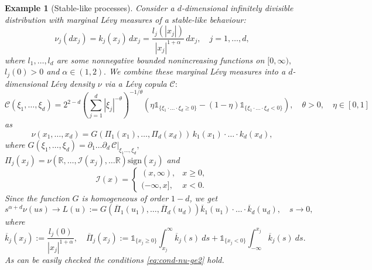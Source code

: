 \documentclass[preprint, 3p, authoryear]{elsarticle}
\newcommand{\In}{\mathds{1}}
\newtheorem{example}{Example}
\theoremstyle{definition}
\begin{document}
\begin{example}[Stable-like processes]
Consider a \(d\)-dimensional infinitely divisible distribution with  marginal L\'evy measures of a stable-like behaviour:
\[
\nu_{j}(dx_{j})=k_{j}(x_{j})\, dx_{j}=\frac{l_{j}(|x_{j}|)}{|x_{j}|^{1+\alpha}}\, dx_{j},\quad j=1,\ldots,d,
\]
where $l_{1},\ldots,l_{d}$ are some nonnegative bounded nonincreasing functions on $[0,\infty),$  $l_{j}(0)>0$ and $\alpha\in (1,2).$  We combine these marginal L\'evy measures into a \(d\)-dimensional L\'evy density \(\nu\) via a L\'evy copula $\mathcal{C}:$
\[
\mathcal{C}(\xi_{1},\ldots,\xi_{d})=2^{2-d}\left(\sum_{j=1}^{d}\left|\xi_{j}\right|^{-\theta}\right)^{-1/\theta}\left(\eta \In_{\{\xi_{1}\cdot\ldots\cdot\xi_{d}\geq0\}}-(1-\eta)\In_{\{\xi_{1}\cdot\ldots\cdot\xi_{d}<0\}}\right), \quad \theta>0, \quad \eta\in[0,1]
\]
 as 
\[
\nu(x_{1},\ldots,x_{d})=G(\Pi_{1}(x_{1}),\ldots,\Pi_{d}(x_{d}))\, k_{1}(x_{1})\cdot\ldots\cdot k_{d}(x_{d}),
\]
where $G(\xi_{1},\ldots,\xi_{d})=\left.\partial_{1}\ldots\partial_{d}\mathcal{\, C}\right|_{\xi_{1}\ldots,\xi_{d}},$ \(\Pi_{j}(x_{j})=\nu\left(\mathbb{R},\ldots,\mathcal{I}(x_{j}),\ldots\mathbb{R}\right)\mathrm{sign}(x_{j})\)
and
\[
\mathcal{I}(x)=\begin{cases}
(x,\infty), & x\geq0,\\
(-\infty,x], & x<0.
\end{cases}
\]
Since the function $G$ is homogeneous of order $1-d$, we get 
\[
s^{\alpha+d}\nu(us)\to  L(u):=G\left(\overline{\Pi}_{1}(u_{1}),\ldots,\overline{\Pi}_{d}(u_{d})\right)
\overline{k}_{1}(u_{1})\cdot\ldots\cdot\overline{k}_{d}(u_{d}), \quad s \to 0,
\]
where
\[
\overline{k}_{j}(x_{j}):=\frac{l_{j}(0)}{|x_{j}|^{1+\alpha}},\quad\overline{\Pi}_{j}(x_{j}):=\In_{\{x_{j}\geq0\}}\int_{x_{j}}^{\infty}\overline{k}_{j}(s)\: ds+\In_{\{x_{j}<0\}}\int_{-\infty}^{x_{j}}\overline{k}_{j}(s)\: ds.
\]
As can be easily checked the conditions \eqref{eq:cond-nu-ge2} hold.
\end{example}
\end{document}
